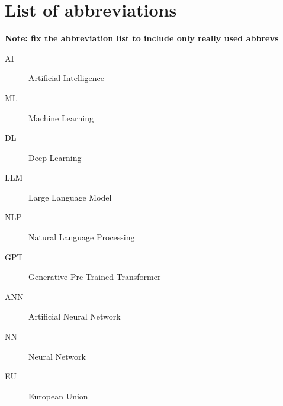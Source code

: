 \chapter*{List of abbreviations}

\textbf{Note: fix the abbreviation list to include only really used abbrevs}

\begin{description}
    \item[AI] Artificial Intelligence
\end{description}

\begin{description}
    \item[ML] Machine Learning
\end{description}

\begin{description}
    \item[DL] Deep Learning
\end{description}

\begin{description}
    \item[LLM] Large Language Model
\end{description}

\begin{description}
    \item[NLP] Natural Language Processing
\end{description}

\begin{description}
    \item[GPT] Generative Pre-Trained Transformer
\end{description}

\begin{description}
    \item[ANN] Artificial Neural Network
\end{description}

\begin{description}
    \item[NN] Neural Network 
\end{description}

\begin{description}
    \item[EU] European Union 
\end{description}

